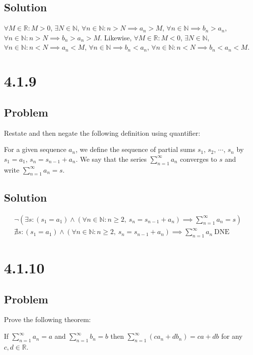 \documentclass[12pt]{article}
\newcommand{\round}[1]{\left(       #1 \right)      }
\newcommand{\R}    [0]{\mathbb{R}                   }
\newcommand{\N}    [0]{\mathbb{N}                   }
\begin{document}
\subsection*{Solution}
$\forall M \in \R : M > 0$, $\exists N \in \N$, $\forall n \in \N : n > N \implies a_n > M$, $\forall n \in \N \implies b_n > a_n$, $\forall n \in \N : n > N \implies b_n > a_n > M$. Likewise, $\forall M \in \R : M < 0$, $\exists N \in \N$, $\forall n \in \N : n < N \implies a_n < M$, $\forall n \in \N \implies b_n < a_n$, $\forall n \in \N : n < N \implies b_n < a_n < M$.



\section*{4.1.9}

\subsection*{Problem}
Restate and then negate the following definition using quantifier:

For a given sequence $a_n$, we define the sequence of partial sums $s_1$, $s_2$, $\cdots$, $s_n$ by $s_1 = a_1$, $s_n = s_{n - 1} + a_n$. We say that the series $\sum_{n = 1}^\infty a_n$ converges to $s$ and write $\sum_{n = 1}^\infty a_n = s$.

\subsection*{Solution}
\begin{align*}
    \neg \round{\exists s : (s_1 = a_1) \wedge (\forall n \in \N : n \geq 2,\ s_n = s_{n-1} + a_n) \implies \sum_{n=1}^\infty a_n = s} \\
    \nexists s : (s_1 = a_1) \wedge (\forall n \in \N : n \geq 2,\ s_n = s_{n-1} + a_n) \implies \sum_{n=1}^\infty a_n \ \text{DNE}
\end{align*}



\section*{4.1.10}

\subsection*{Problem}
Prove the following theorem:

If $\sum_{n = 1}^\infty a_n = a$ and $\sum_{n = 1}^\infty b_n = b$ then $\sum_{n = 1}^\infty (c a_n + d b_n) = ca + db$ for any $c, d \in \R$.
\end{document}
